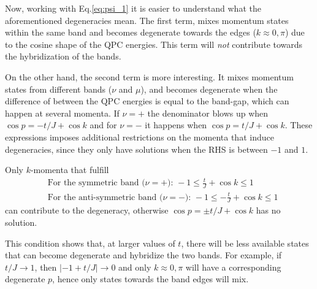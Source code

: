 \documentclass{article}
\begin{document}
Now, working with Eq.\eqref{eq:psi_1} it is easier to understand what the aforementioned degeneracies mean. The first term, mixes momentum states within the same band and becomes degenerate towards the edges ($k\approx 0, \pi$) due to the cosine shape of the QPC energies. This term will \textit{not} contribute towards the hybridization of the bands. 

On the other hand, the second term is more interesting. It mixes momentum states from different bands ($\nu$ and $\mu$), and becomes degenerate when the difference of between the QPC energies is equal to the band-gap, which can happen at several momenta. If $\nu = +$ the denominator blows up when $\cos p= -t/J + \cos k$ and for $\nu = -$ it happens when $\cos p= t/J + \cos k$. These expressions imposes additional restrictions on the momenta that induce degeneracies, since they only have solutions when the RHS is between $-1$ and $1$.

\begin{tcolorbox}[title=Degeneracy Condition, colback=white, colframe=black]
Only $k$-momenta that fulfill
\begin{align}\label{eq:arccos_condition}
    & \text{For the symmetric band ($\nu = +$): } -1 \leq \frac{t}{J} + \cos{k} \leq 1 \\
    & \text{For the anti-symmetric band ($\nu = -$): } -1 \leq -\frac{t}{J} + \cos{k} \leq 1
\end{align}
can contribute to the degeneracy, otherwise $\cos p= \pm t/J + \cos k$ has no solution.
\end{tcolorbox}

This condition shows that, at larger values of $t$, there will be less available states that can become degenerate and hybridize the two bands. For example, if $t/J\rightarrow 1$, then $|-1+t/J|\rightarrow 0$ and only $k\approx 0,  \pi$ will have a corresponding degenerate $p$, hence only states towards the band edges will mix.
\end{document}

